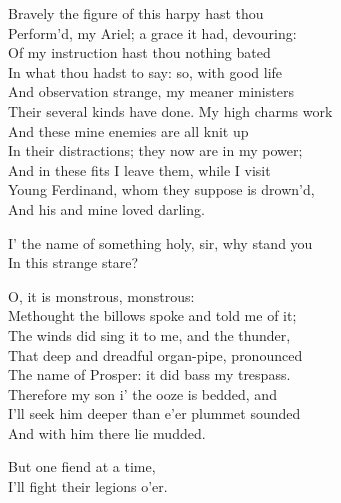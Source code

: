 
\begin{verse_speech}[Prospero] 
Bravely the figure of this harpy hast thou\\
Perform'd, my Ariel; a grace it had, devouring:\\
Of my instruction hast thou nothing bated\\
In what thou hadst to say: so, with good life\\
And observation strange, my meaner ministers\\
Their several kinds have done. My high charms work\\
And these mine enemies are all knit up\\
In their distractions; they now are in my power;\\
And in these fits I leave them, while I visit\\
Young Ferdinand, whom they suppose is drown'd,\\
And his and mine loved darling.
\end{verse_speech}


\begin{verse_speech}[Gonzalo] 
I' the name of something holy, sir, why stand you\\
In this strange stare?
\end{verse_speech}

\begin{verse_speech}[Alonso] 
O, it is monstrous, monstrous:\\
Methought the billows spoke and told me of it;\\
The winds did sing it to me, and the thunder,\\
That deep and dreadful organ-pipe, pronounced\\
The name of Prosper: it did bass my trespass.\\
Therefore my son i' the ooze is bedded, and\\
I'll seek him deeper than e'er plummet sounded\\
And with him there lie mudded.
\end{verse_speech}


\begin{verse_speech}[Sebastian] 
But one fiend at a time,\\
I'll fight their legions o'er.
\end{verse_speech}

